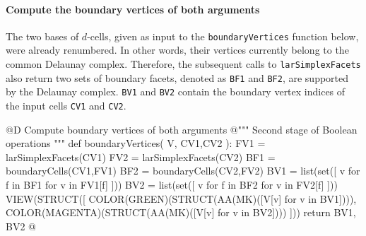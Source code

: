 \documentclass[11pt,oneside]{article}	%
\begin{document}
\paragraph{Compute the boundary vertices of both arguments}
The two bases of $d$-cells, given as input to the \texttt{boundaryVertices} function below, were already renumbered. In other words, their vertices currently belong to the common Delaunay complex. Therefore, the subsequent calls to \texttt{larSimplexFacets} also return two sets of boundary facets, denoted as \texttt{BF1} and \texttt{BF2}, are supported by the Delaunay complex. \texttt{BV1} and \texttt{BV2} contain the boundary vertex indices of the input cells \texttt{CV1} and \texttt{CV2}.

@D Compute boundary vertices of both arguments
@{""" Second stage of Boolean operations """
def boundaryVertices( V, CV1,CV2 ):
	FV1 = larSimplexFacets(CV1)
	FV2 = larSimplexFacets(CV2)
	BF1 = boundaryCells(CV1,FV1)
	BF2 = boundaryCells(CV2,FV2)
	BV1 = list(set([ v for f in BF1 for v in FV1[f] ]))
	BV2 = list(set([ v for f in BF2 for v in FV2[f] ]))
	VIEW(STRUCT([ 
		COLOR(GREEN)(STRUCT(AA(MK)([V[v] for v in BV1]))), 
		COLOR(MAGENTA)(STRUCT(AA(MK)([V[v] for v in BV2]))) ]))
	return BV1, BV2
@}
\end{document}
